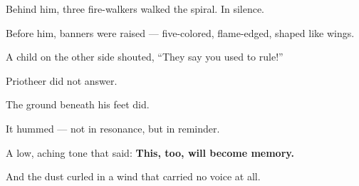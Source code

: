 \documentclass[10pt]{article}
\begin{document}
Behind him, three fire-walkers walked the spiral.  
In silence.

Before him, banners were raised —  
five-colored, flame-edged, shaped like wings.

A child on the other side shouted,  
 “They say you used to rule!”

Priotheer did not answer.

The ground beneath his feet did.

It hummed —  
not in resonance,  
but in reminder.

A low, aching tone  
that said:  
 \textbf{This, too, will become memory.}

And the dust curled in a wind  
that carried no voice at all.
\end{document}
